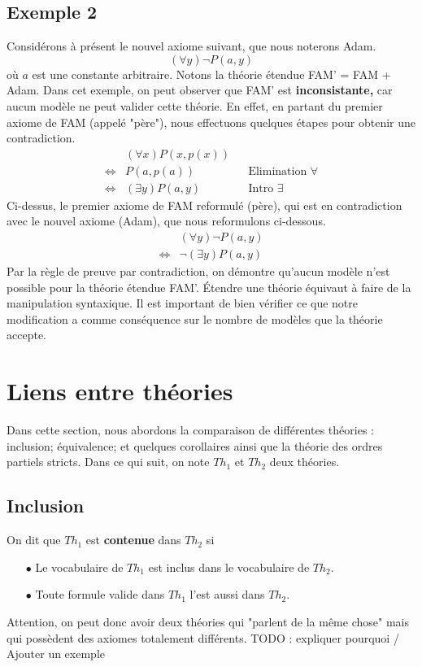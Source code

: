 \subsection*{Exemple 2}
Considérons à présent le nouvel axiome suivant, que nous noterons Adam.
$$ (\forall y) \neg P(a,y) $$
où $a$ est une constante arbitraire. Notons la théorie étendue FAM' = FAM + Adam. Dans cet exemple, on peut observer que FAM' est \textbf{inconsistante,} car aucun modèle ne peut valider cette théorie. En effet, en partant du premier axiome de FAM (appelé "père"), nous effectuons quelques étapes pour obtenir une contradiction.
\begin{align*}
& (\forall x) P(x,p(x)) \\
\iff & P(a,p(a)) && \textrm{Elimination } \forall \\
\iff & (\exists y) P(a,y) && \textrm{Intro } \exists
\end{align*}
Ci-dessus, le premier axiome de FAM reformulé (père), qui est en contradiction avec le nouvel axiome (Adam), que nous reformulons ci-dessous.
\begin{align*}
& (\forall y) \neg P(a,y) \\
\iff & \neg (\exists y) P(a,y)
\end{align*}
Par la règle de preuve par contradiction, on démontre qu'aucun modèle n'est possible pour la théorie étendue FAM'. \'{E}tendre une théorie équivaut à faire de la manipulation syntaxique. Il est important de bien vérifier ce que notre modification a comme conséquence sur le nombre de modèles que la théorie accepte.

\section{Liens entre théories}
Dans cette section, nous abordons la comparaison de différentes théories : inclusion; équivalence; et quelques corollaires ainsi que la théorie des ordres partiels stricts. Dans ce qui suit, on note $Th_1$ et $Th_2$ deux théories.

\subsection*{Inclusion}
On dit que $Th_1$ est \textbf{contenue} dans $Th_2$ si
\begin{itemize}
\item[$\bullet$] Le vocabulaire de $Th_1$ est inclus dans le vocabulaire de $Th_2$.
\item[$\bullet$] Toute formule valide dans $Th_1$ l'est aussi dans $Th_2$.
\end{itemize}
Attention, on peut donc avoir deux théories qui "parlent de la même chose" mais qui possèdent des axiomes totalement différents.
TODO : expliquer pourquoi / Ajouter un exemple

